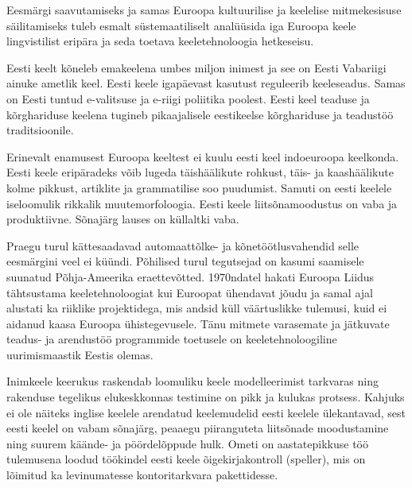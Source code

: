 \documentclass[]{../metanetpaper}
\begin{document}
\begin{multicols}{2}
Eesmärgi saavutamiseks ja samas Euroopa kultuurilise ja keelelise mitmekesisuse säilitamiseks tuleb esmalt süstemaatiliselt analüüsida iga Euroopa keele lingvistilist eripära ja seda toetava keeletehnoloogia hetkeseisu. 

Eesti keelt kõneleb emakeelena umbes miljon inimest ja see on Eesti Vabariigi ainuke ametlik keel. Eesti keele igapäevast kasutust reguleerib keeleseadus. Samas on Eesti tuntud e-valitsuse ja e-riigi poliitika poolest.
Eesti keel teaduse ja kõrghariduse keelena tugineb pikaajalisele eestikeelse kõrghariduse ja teadustöö traditsioonile.

Erinevalt enamusest Euroopa keeltest ei kuulu eesti keel indoeuroopa keelkonda. 
Eesti keele eripäradeks võib lugeda täishäälikute rohkust, täis- ja kaashäälikute kolme pikkust, artiklite ja grammatilise soo puudumist. 
Samuti on eesti keelele iseloomulik rikkalik muutemorfoloogia. 
Eesti keele liitsõnamoodustus on vaba ja produktiivne. Sõnajärg lauses on küllaltki vaba.



Praegu turul kättesaadavad automaattõlke- ja kõnetöötlusvahendid selle eesmärgini veel ei küündi. 
Põhilised turul tegutsejad on kasumi saamisele suunatud Põhja-Ameerika eraettevõtted. 
1970ndatel hakati Euroopa Liidus tähtsustama keeletehnoloogiat kui Euroopat ühendavat jõudu ja samal ajal alustati ka riiklike projektidega, mis andsid küll väärtuslikke tulemusi, kuid ei aidanud kaasa Euroopa ühistegevusele. 
Tänu mitmete varasemate ja jätkuvate teadus- ja arendustöö programmide toetusele on keeletehnoloogiline uurimismaastik Eestis olemas.

Inimkeele keerukus raskendab loomuliku keele modelleerimist tarkvaras ning raken\-duse tegelikus elukeskkonnas testimine on pikk ja kulukas protsess. 
Kahjuks ei ole näiteks inglise keelele arendatud keelemudelid eesti keelele ülekantavad, sest eesti keelel on vabam sõnajärg, peaaegu piiranguteta liitsõnade moodustamine ning suurem käände- ja pöördelõppude hulk. 
Ometi on aastatepikkuse töö tulemusena loodud töökindel eesti keele õigekirjakontroll (speller), mis on lõimitud ka levinumatesse kontoritarkvara pakettidesse.


\end{multicols}
\end{document}
